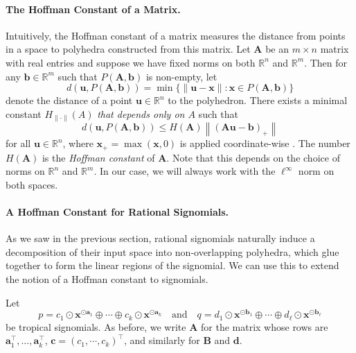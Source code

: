 \documentclass[10pt]{article}
\theoremstyle{definition}
\theoremstyle{remark}
\newcommand{\RR}{{\mathbb{R}}}
\renewcommand{\vec}[1]{\mathbf{#1}}
\def\va{{\vec{a}}}
\def\vb{{\vec{b}}}
\def\vc{{\bm{c}}}
\def\vu{{\bm{u}}}
\def\vx{{\vec{x}}}
\def\mA{{\bm{A}}}
\begin{document}
\paragraph{The Hoffman Constant of a Matrix.} Intuitively, the Hoffman constant of a matrix measures the distance from points in a space to polyhedra constructed from this matrix.
Let $\mA$ be an $m\times n$ matrix with real entries and suppose we have fixed norms on both $\RR^n$ and $\RR^m$. Then for any $\vb\in\mathbb{R}^m$ such that $P(\mA, \vb)$ is non-empty, let
$$
d(\vu,P(\mA, \vb))=\min\{\|\vu- \vx\|:\vx\in P(\mA, \vb)\}
$$
denote the distance of a point $\vu\in\mathbb{R}^n$ to the polyhedron. There exists a minimal constant $H_{\|\cdot\|}(A)$ \emph{that depends only on $A$} such that
\begin{equation}\label{eq:hoff-fundamental}
    d(\vu,P(\mA, \vb))\le H(\mA)\left\|(\mA \mathbf{u}-\vb)_+\right\|
\end{equation}
for all  $\vu\in\mathbb{R}^n$, where $\vx_+=\max(\vx,0)$ is applied coordinate-wise \citep{hoffman1952approximate}. The number $H(\mA)$ is the \emph{Hoffman constant} of $\mA$. Note that this depends on the choice of norms on $\RR^n$ and $\RR^m$. In our case, we will always work with the $\ell^\infty$ norm on both spaces.

\paragraph{A Hoffman Constant for Rational Signomials.} As we saw in the previous section, rational signomials naturally induce a decomposition of their input space into non-overlapping polyhedra, which glue together to form the linear regions of the signomial. We can use this to extend the notion of a Hoffman constant to signomials.

Let $$p = c_1 \odot \vx^{\odot \va_1} \oplus \dotsb \oplus c_k \odot \vx^{\odot \va_k} \quad \mbox{and} \quad q = d_1 \odot \vx^{\odot \vb_1} \oplus \dotsb \oplus d_\ell \odot \vx^{\odot \vb_\ell}$$ be tropical signomials.
As before, we write $\mA$ for the matrix whose rows are $\va_1^{\top},\dotsc,\va_k^{\top}$, $\vc = (c_1, \dotsb, c_k)^{\top}$, and similarly for $\mathbf{B}$ and $\mathbf{d}$.
\end{document}
